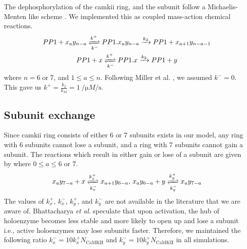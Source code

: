 \documentclass[9pt,lineno,doublespacing]{elife}
\begin{document}
{The dephosphorylation of the \gls{camkii} ring, and the subunit follow a
Michaelis-Menten like scheme . We implemented this 
as coupled mass-action chemical reactions.
\begin{equation}\label{eq:dephosphorylation}
    \begin{gathered}
        PP1 + x_ay_{n-a} \xrightleftharpoons[k^-]{k^+} PP1.x_ay_{n-a} 
            \xrightarrow{k_2} PP1 + x_{a+1}y_{n-a-1} \\
        PP1 + x \xrightleftharpoons[k^-]{k^+} PP1.x \xrightarrow{k_2} PP1 + y
    \end{gathered}
\end{equation} where $n=6\;\text{or}\;7$, and $1\le a \le n$. Following Miller
et al. \citep{miller_stability_2005}, we assumed $k^-=0$. This gave us
$k^+=\frac{k_2}{k_M}=\SI{1}{\per\micro M\per\second}$.

\subsection{Subunit exchange}\label{subunit exchange}
Since \gls{camkii} ring consists of either 6 or 7 subunits exists in our model,
any ring with 6 subunits cannot lose a subunit, and a ring with 7 subunits cannot
gain a subunit. The reactions which result in either gain or lose of a
subunit are given by  where $0\le a \le 6\text{ or }7$.
\begin{equation}\label{eq:losegainx}
    \begin{gathered}
    x_ay_{7-a} + x \xrightleftharpoons[k^-_x]{k^+_x} x_{a+1}y_{6-a},\,
    x_ay_{6-a} + y \xrightleftharpoons[k^-_y]{k^+_y} x_{a}y_{7-a}
    \end{gathered}
\end{equation}
The values of $k_x^+$, $k_x^-$, $k_y^+$, and $k_y^-$ are not available in the
literature that we are aware of. Bhattacharya \textit{et al}. 
\citep{bhattacharyya_molecular_2016} speculate that upon activation, the hub
of holoenzyme becomes less stable and more likely to open up and lose a subunit
i.e., active holoenzymes may lose subunits faster. Therefore, we maintained the
following ratio \(k_x^- = 10 k_x^+ N_{\text{CaMKII}}\) and \(k_y^- = 10 k_y^+
N_{\text{CaMKII}}\) in all simulations.

}
\end{document}
